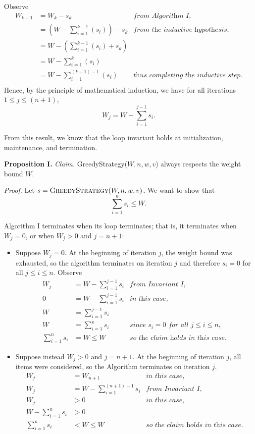 \begin{enumerate}
\begin{solution}
Observe
\begin{align*}
W_{k+1}&=W_k-s_k&\textit{from Algorithm I,}\\
&=\left(W-\sum_{i=1}^{k-1}(s_i)\right)-s_k&\textit{from the inductive hypothesis,}\\
&=W-\left(\sum_{i=1}^{k-1}(s_i)+s_k\right)\\
&=W-\sum_{i=1}^{k}(s_i)\\
&=W-\sum_{i=1}^{(k+1)-1}(s_i)&\textit{thus completing the inductive step.}\\
\end{align*}
Hence, by the principle of mathematical induction, we have for all iterations $1\leq j\leq(n+1)$, \[W_j=W-\sum_{i=1}^{j-1}{s_i}.\] 

From this result, we know that the loop invariant holds at initialization, maintenance, and termination.

\textbf{Proposition I. }\textit{Claim. }{\sc GreedyStrategy}($W,n,w,v$) always respects the weight bound $W$.

\textit{Proof. }Let $s=\textsc{GreedyStrategy}(W,n,w,v)$. We want to show that \[\sum_{i=1}^n{s_i}\leq W.\]

Algorithm I terminates when its loop terminates; that is, it terminates when $W_j=0$, or when $W_j>0$ and $j=n+1$:
\begin{itemize}
    \item Suppose $W_j=0$. At the beginning of iteration $j$, the weight bound was exhausted, so the algorithm terminates on iteration $j$ and therefore $s_i=0$ for all $j\leq i\leq n$. Observe
    \begin{align*}
    W_j&=W-\sum_{i=1}^{j-1}{s_i}&\textit{from Invariant I,}\\
    0&=W-\sum_{i=1}^{j-1}{s_i}&\textit{in this case,}\\
    W&=\sum_{i=1}^{j-1}{s_i}\\
    W&=\sum_{i=1}^n{s_i}&\textit{since $s_i=0$ for all $j\leq i\leq n$,}\\
    \sum_{i=1}^n{s_i}&=W\leq W&\textit{so the claim holds in this case.}
    \end{align*}
    \item Suppose instead $W_j>0$ and $j=n+1$. At the beginning of iteration $j$, all items were considered, so the Algorithm terminates on iteration $j$.
    \begin{align*}
    W_j&=W_{n+1}&\textit{in this case,}\\
    W_j&=W-\sum_{i=1}^{(n+1)-1}{s_i}&\textit{from Invariant I,}\\
    W_j&>0&\textit{in this case,}\\
    W-\sum_{i=1}^{n}{s_i}&>0\\
    \sum_{i=1}^{n}{s_i}&<W\leq W&\textit{so the claim holds in this case.}
    \end{align*}
\end{itemize}


\end{solution}
\end{enumerate}
